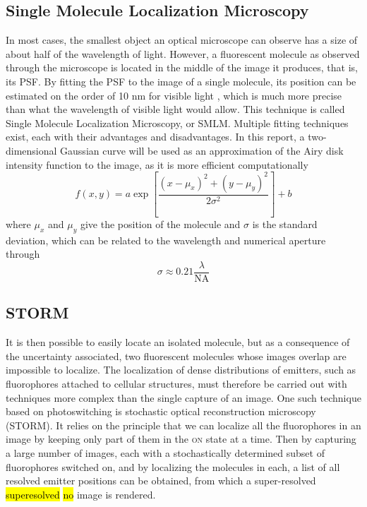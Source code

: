 \subsection{Single Molecule Localization Microscopy} \label{sec:SMLM}
In most cases, the smallest object an optical microscope can observe has a size of about half of the wavelength of light. However, a fluorescent molecule as observed through the microscope is located in the middle of the image it produces, that is, its PSF. By fitting the PSF to the image of a single molecule, its position can be estimated on the order of 10 nm for visible light \cite{douglass_notice_2023}, which is much more precise than what the wavelength of visible light would allow. This technique is called Single Molecule Localization Microscopy, or SMLM. Multiple fitting techniques exist, each with their advantages and disadvantages. In this report, a two-dimensional Gaussian curve will be used as an approximation of the Airy disk intensity function to the image, as it is more efficient \mbox{computationally \cite{douglass_notice_2023}}
\begin{equation}
    f(x, y) = a \exp \left[ \frac{(x-\mu_x)^2 + (y-\mu_y)^2}{2 \sigma^2} \right] + b
\end{equation}
where $\mu_x$ and $\mu_y$ give the position of the molecule and $\sigma$ is the standard deviation, which can be related to the wavelength and numerical aperture through \cite{zhang-appliedoptics-2007}
\begin{equation}
    \sigma \approx 0.21 \frac{\lambda}{\textrm{NA}}
    \label{eq:PSF_width_gaussian}
\end{equation}


\subsection{STORM} \label{sec:STORM}
It is then possible to easily locate an isolated molecule, but as a consequence of the uncertainty associated, two fluorescent molecules whose images overlap are impossible to localize.
The localization of dense distributions of emitters, such as fluorophores attached to cellular structures, must therefore be carried out with techniques more complex than the single capture of an image.
One such technique based on photoswitching is stochastic optical reconstruction microscopy (STORM).
It relies on the principle that we can localize all the fluorophores in an image by keeping only part of them in the \textsc{on} state  at a time.
Then by capturing a large number of images, each with a stochastically determined subset of fluorophores switched on, and by localizing the molecules in each, a list of all resolved emitter positions can be obtained, from which a super-resolved \hl{superesolved} \hl{no} image is rendered.

